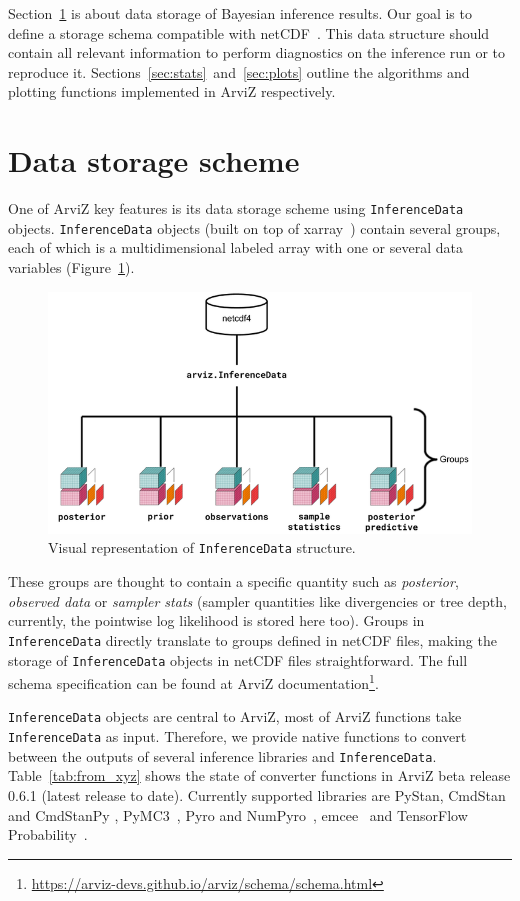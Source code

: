 \documentclass[anonymous=false, %
               format=acmsmall, %
               review=true, %
               screen=true, %
               nonacm=true]{acmart}
\begin{document}
Section~\ref{sec:data} is about data storage of Bayesian inference
results. Our goal is to define a storage schema compatible with
netCDF~\cite{unidata2011network}. This data structure should contain all
relevant information to
perform diagnostics on the inference run or to reproduce it.
Sections~\ref{sec:stats}~and~\ref{sec:plots} outline the algorithms and
plotting functions implemented in ArviZ respectively.

\section{Data storage scheme}\label{sec:data}
One of ArviZ key features is its data storage scheme using
\texttt{InferenceData} objects. \texttt{InferenceData} objects (built on
top of xarray~\cite{hoyer2017xarray}) contain several groups, each of which is
a multidimensional labeled array with one or several data variables
(Figure~\ref{fig:data}).

\begin{figure}[!hbt]
  \centering
  \includegraphics[width=0.6\linewidth]{InferenceDataStructure.png}
  \caption{Visual representation of \texttt{InferenceData}
  structure.}\label{fig:data}
\end{figure}

These groups are thought to contain a specific quantity such as \emph{posterior},
\emph{observed data} or \emph{sampler stats} (sampler quantities like
divergencies or tree depth, currently, the pointwise log likelihood is
stored here too). Groups in \texttt{InferenceData} directly translate to
groups defined in netCDF files, making the storage of \texttt{InferenceData}
objects in netCDF files straightforward. The full schema specification
can be found at ArviZ
documentation\footnote{\url{https://arviz-devs.github.io/arviz/schema/schema.html}}.

\texttt{InferenceData} objects are central to ArviZ, most of ArviZ functions
take \texttt{InferenceData} as input. Therefore, we provide native functions
to convert between the outputs of several inference libraries and
\texttt{InferenceData}. Table~\ref{tab:from_xyz} shows the state of
converter functions in ArviZ beta release 0.6.1 (latest release to date).
Currently supported libraries are PyStan, CmdStan and CmdStanPy
\cite{stan2018language, stan2018math, stan2018core, pystan2018}, %
PyMC3~\cite{pymc32016}, Pyro and NumPyro~\cite{pyro2018},
emcee~\cite{emcee2013, emcee2019} and
TensorFlow Probability~\cite{tensorflow_probability2017}.
\end{document}
